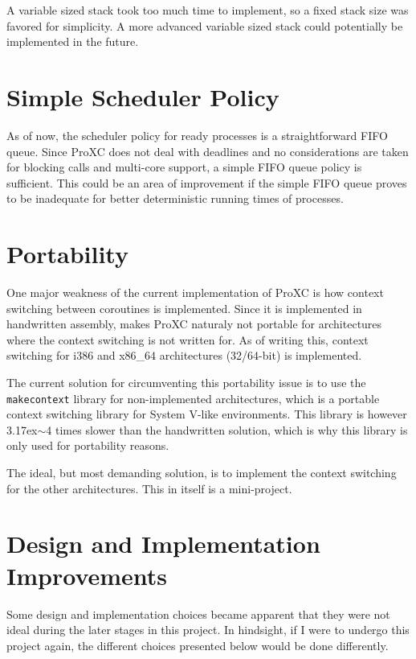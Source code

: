 A variable sized stack took too much time to implement, so a fixed stack size was favored for simplicity. A more advanced variable sized stack could potentially be implemented in the future. 

\section{Simple Scheduler Policy}

As of now, the scheduler policy for ready processes is a straightforward FIFO queue. Since ProXC does not deal with deadlines and no considerations are taken for blocking calls and multi\hyp{}core support, a simple FIFO queue policy is sufficient. This could be an area of improvement if the simple FIFO queue proves to be inadequate for better deterministic running times of processes. 

\section{Portability}
\label{sec:portability}

One major weakness of the current implementation of ProXC is how context switching between coroutines is implemented. Since it is implemented in handwritten assembly, makes ProXC naturaly not portable for architectures where the context switching is not written for. As of writing this, context switching for i386 and x86\_64 architectures (32/64\hyp{}bit) is implemented.

The current solution for circumventing this portability issue is to use the \texttt{makecontext} \citep{manmakecontext} library for non\hyp{}implemented architectures, which is a portable context switching library for System V\hyp{}like environments. This library is however 3{\raise.17ex\hbox{$\scriptstyle\mathtt{\sim}$}}4 times slower than the handwritten solution, which is why this library is only used for portability reasons. 

The ideal, but most demanding solution, is to implement the context switching for the other architectures. This in itself is a mini\hyp{}project.

\section{Design and Implementation Improvements}

Some design and implementation choices became apparent that they were not ideal during the later stages in this project. In hindsight, if I were to undergo this project again, the different choices presented below would be done differently.

